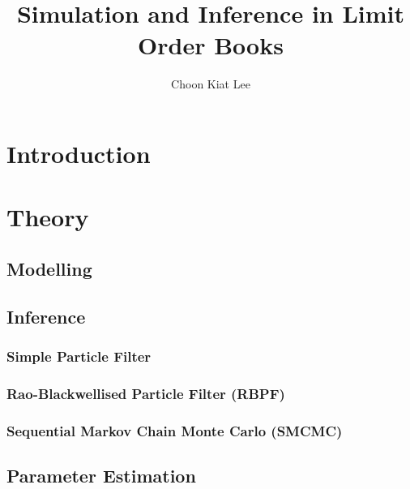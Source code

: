 \documentclass[12pt]{article}
\title{Simulation and Inference in Limit Order Books}
\author{Choon Kiat Lee}
\date{ }
\begin{document}
\noindent

\maketitle

\tableofcontents



\section{Introduction}

\section{Theory}

    \subsection{Modelling}
    
    \subsection{Inference}
    
    \subsubsection{Simple Particle Filter}
    
    \subsubsection{Rao-Blackwellised Particle Filter (RBPF)}
    
    \subsubsection{Sequential Markov Chain Monte Carlo (SMCMC)}
    
    \subsection{Parameter Estimation}
\end{document}
